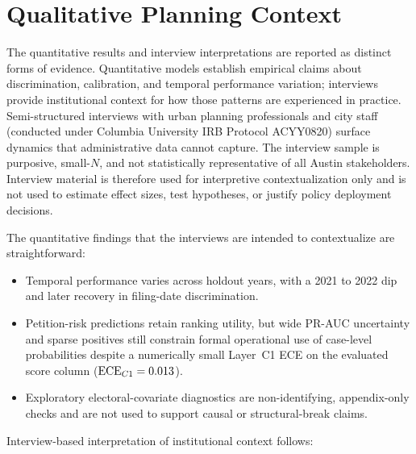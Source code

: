 \documentclass[11pt, letterpaper]{article}
\begin{document}
\section{Qualitative Planning Context}
\label{sec:interviews}

The quantitative results and interview interpretations are reported as distinct forms of evidence. Quantitative models establish empirical claims about discrimination, calibration, and temporal performance variation; interviews provide institutional context for how those patterns are experienced in practice. Semi-structured interviews with urban planning professionals and city staff (conducted under Columbia University IRB Protocol ACYY0820) surface dynamics that administrative data cannot capture. The interview sample is purposive, small-$N$, and not statistically representative of all Austin stakeholders. Interview material is therefore used for interpretive contextualization only and is not used to estimate effect sizes, test hypotheses, or justify policy deployment decisions.

The quantitative findings that the interviews are intended to contextualize are straightforward:
\begin{itemize}
    \item Temporal performance varies across holdout years, with a 2021 to 2022 dip and later recovery in filing-date discrimination.
    \item Petition-risk predictions retain ranking utility, but wide PR-AUC uncertainty and sparse positives still constrain formal operational use of case-level probabilities despite a numerically small Layer~C1 ECE on the evaluated score column ($\text{ECE}_{C1}=0.013{}$).
    \item Exploratory electoral-covariate diagnostics are non-identifying, appendix-only checks and are not used to support causal or structural-break claims.
\end{itemize}

Interview-based interpretation of institutional context follows:
\end{document}
